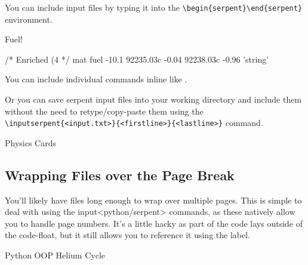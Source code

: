 \documentclass{article}
\begin{document}
You can include input files by typing it into the \verb|\begin{serpent}\end{serpent}| environment.

\begin{code}\caption{Fuel!} \begin{serpent}
    /*
    Enriched (4%
    */
    mat fuel     -10.1
    92235.03c    -0.04 
    92238.03c    -0.96
    'string'
\end{serpent}\label{code:fuel}\end{code}

You can include individual commands inline like .

Or you can save serpent input files into your working directory and include them without the need to retype/copy-paste them using the \\ \verb|\inputserpent{<input.txt>}{<firstline>}{<lastline>}| command.

\begin{code}\caption{Physics Cards}
    \label{code:physics}\end{code}

\newpage
\subsection*{Wrapping Files over the Page Break}
You'll likely have files long enough to wrap over multiple pages. This is simple to deal with using the input<python/serpent> commands, as these natively allow you to handle page numbers. It's a little hacky as part of the code lays outside of the code-float, but it still allows you to reference it using the label.

\begin{code}\caption{Python OOP Helium Cycle}
    \label{code:brayton}\end{code}
    \newpage
    \newpage
    \newpage
    \newpage
\end{document}
